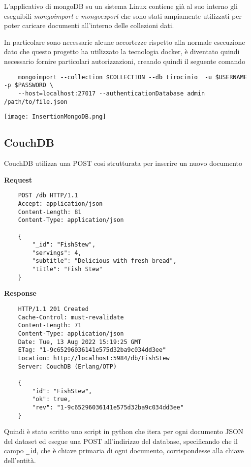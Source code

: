 L'applicativo di mongoDB su un sistema Linux contiene già al suo interno gli eseguibili \emph{mongoimport} e \emph{mongoexport} che sono stati ampiamente 
utilizzati per poter caricare documenti all'interno delle collezioni dati. 

In particolare sono necessarie alcune accortezze rispetto alla normale esecuzione dato che questo progetto ha utilizzato la tecnologia docker, è diventato 
quindi necessario fornire particolari autorizzazioni, creando quindi il seguente comando 

\begin{verbatim}
    mongoimport --collection $COLLECTION --db tirocinio  -u $USERNAME -p $PASSWORD \
    --host=localhost:27017 --authenticationDatabase admin  /path/to/file.json
\end{verbatim}

\begin{center}
    \texttt{[image: InsertionMongoDB.png]}
\end{center}


\subsection{CouchDB}

CouchDB utilizza una POST cosi strutturata per inserire un nuovo documento 

\textbf{Request}

\begin{verbatim}
    POST /db HTTP/1.1
    Accept: application/json
    Content-Length: 81
    Content-Type: application/json

    {
        "_id": "FishStew",
        "servings": 4,
        "subtitle": "Delicious with fresh bread",
        "title": "Fish Stew"
    }
\end{verbatim}


\textbf{Response}

\begin{verbatim}
    HTTP/1.1 201 Created
    Cache-Control: must-revalidate
    Content-Length: 71
    Content-Type: application/json
    Date: Tue, 13 Aug 2022 15:19:25 GMT
    ETag: "1-9c65296036141e575d32ba9c034dd3ee"
    Location: http://localhost:5984/db/FishStew
    Server: CouchDB (Erlang/OTP)
    
    {
        "id": "FishStew",
        "ok": true,
        "rev": "1-9c65296036141e575d32ba9c034dd3ee"
    }
\end{verbatim}

Quindi è stato scritto uno script in python che itera per ogni documento JSON del dataset ed esegue una POST all'indirizzo del database, specificando che 
il campo \verb|_id|, che è chiave primaria di ogni documento, corrispondesse alla chiave dell'entità.

